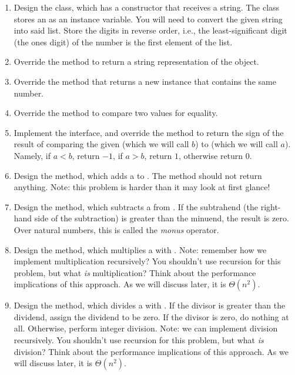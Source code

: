 \begin{enumerate}[label=(\alph*)]
    \item Design the  class, which has a constructor that receives a string. The  class stores an  as an instance variable. You will need to convert the given string into said list. Store the digits in reverse order, i.e., the least-significant digit (the ones digit) of the number is the first element of the list.
    \item Override the  method to return a string representation of the  object. 
    \item Override the  method that returns a new  instance that contains the same number.
    \item Override the  method to compare two  values for equality. 
    \item Implement the  interface, and override the  method to return the sign of the result of comparing the given  (which we will call $b$) to   (which we will call $a$). Namely, if $a < b$, return $-1$, if $a > b$, return $1$, otherwise return $0$.
    \item Design the  method, which adds a  to  . The method should not return anything. Note: this problem is harder than it may look at first glance!
    \item Design the  method, which subtracts a  from  . If the subtrahend (the right-hand side of the subtraction) is greater than the minuend, the result is zero. Over natural numbers, this is called the \textit{monus} operator.
    \item Design the  method, which multiplies a  with  . Note: remember how we implement multiplication recursively? You shouldn't use recursion for this problem, but what \textit{is} multiplication? Think about the performance implications of this approach. As we will discuss later, it is $\Theta(n^2)$.
    \item Design the  method, which divides a  with  . If the divisor is greater than the dividend, assign the dividend to be zero. If the divisor is zero, do nothing at all. Otherwise, perform integer division. Note: we can implement division recursively. You shouldn't use recursion for this problem, but what \textit{is} division? Think about the performance implications of this approach. As we will discuss later, it is $\Theta(n^2)$.
\end{enumerate}

